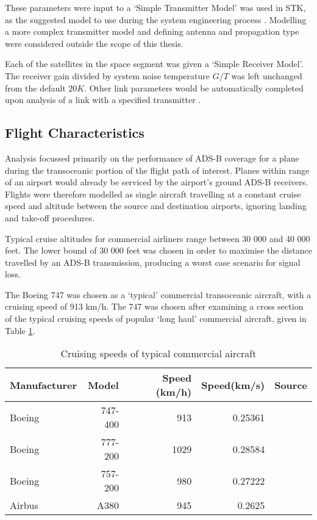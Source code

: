 These parameters were input to a `Simple Transmitter Model' was used in STK, as the suggested model to use during the system engineering process \cite{STKOnline}. Modelling a more complex transmitter model and defining antenna and propagation type were considered outside the scope of this thesis.

Each of the satellites in the space segment was given a `Simple Receiver Model'. The receiver gain divided by system noise temperature $G/T$ was left unchanged from the default $20K$. Other link parameters would be automatically completed upon analysis of a link with a specified transmitter \cite{STKOnline}. 

\subsection{Flight Characteristics}
Analysis focussed primarily on the performance of ADS-B coverage for a plane during the transoceanic portion of the flight path of interest. Planes within range of an airport would already be serviced by the airport's ground ADS-B receivers. Flights were therefore modelled as single aircraft travelling at a constant cruise speed and altitude between the source and destination airports, ignoring landing and take-off procedures.  

Typical cruise altitudes for commercial airliners range between 30 000 and 40 000 feet. The lower bound of 30 000 feet was chosen in order to maximise the distance travelled by an ADS-B transmission, producing a worst case scenario for signal loss.

The Boeing 747 was chosen as a `typical' commercial transoceanic aircraft, with a cruising speed of 913 km/h. The 747 was chosen after examining a cross section of the typical cruising speeds of popular `long haul' commercial aircraft,  given in Table \ref{tab:flightSpecs}.

\begin{table}[H]
  \centering
  \caption{Cruising speeds of typical commercial aircraft}
    \begin{tabular}{lrrrr}
    \toprule
    Manufacturer & Model & Speed (km/h) & Speed(km/s) & Source \\
    \midrule
    Boeing & 747-400 & 913   & 0.25361 & \cite{Boeing747}  \\
    Boeing & 777-200 & 1029 & 0.28584 &  \cite{Boeing777} \\
    Boeing & 757-200 & 980 & 0.27222 & \cite{Boeing757}  \\
    Airbus & A380  & 945   & 0.2625 &  \cite{Frawley2014} \\
    \bottomrule
    \end{tabular}%
  \label{tab:flightSpecs}%
\end{table}%

